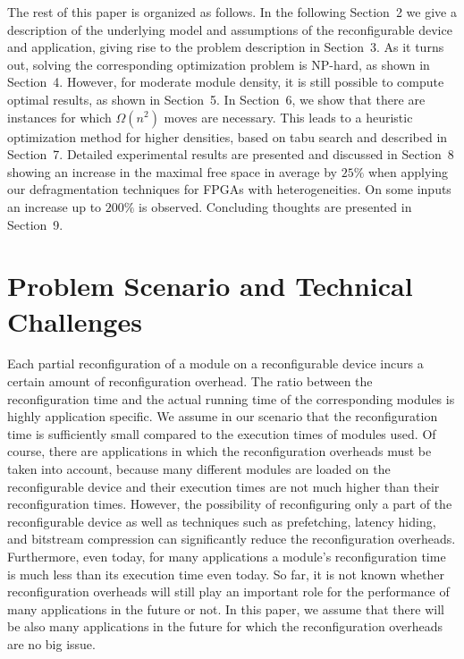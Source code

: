 \documentclass{article}
\begin{document}
The rest of this paper is organized as follows. In the following Section~2
we give a description of the underlying model and assumptions of the reconfigurable device and application, giving rise
to the problem description in Section~3. As it turns out, solving
the corresponding optimization problem is NP-hard, as shown
in Section~4. 
However, for moderate module
density, it is still possible to compute optimal results,
as shown in Section~5. 
In Section~6, we show that there
are instances for which $\Omega(n^2)$ moves are necessary.
This leads to a heuristic optimization method 
for higher densities, based on tabu search and described
in Section~7. Detailed experimental results are presented and discussed in Section~8 showing an increase in the maximal free space in average by $25\%$ when applying our defragmentation techniques for FPGAs with heterogeneities. On some inputs an increase up to $200\%$ is observed. 
Concluding thoughts are presented in Section~9.



\section{Problem Scenario and Technical Challenges} 
\label{sec:scenario}

Each partial reconfiguration of a module on a reconfigurable
device incurs a certain amount of reconfiguration overhead. The
ratio between the reconfiguration time and the actual running time of
the corresponding modules is highly application specific. We assume in
our scenario that the reconfiguration time is sufficiently small
compared to the execution times of modules used. Of course,
there are applications in which the reconfiguration overheads
must be taken into account, because many different modules are loaded on the
reconfigurable device and their execution times are not much higher than their
reconfiguration times. However, the possibility of reconfiguring only a part of
the reconfigurable device as well as techniques such as prefetching, latency hiding,
and bitstream compression can significantly reduce the reconfiguration
overheads. Furthermore, even today, for many applications a module's reconfiguration
time is much less than its execution time even today. So far, it is not known
whether reconfiguration overheads will still play an important role for the
performance of many applications in the future or not. In this paper, we assume
that there will be also many applications in the future for which the
reconfiguration overheads are no big issue.
\end{document}
